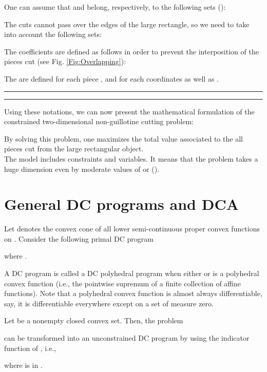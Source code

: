 \documentclass{iesmart}
\begin{document}
One can assume that  and  belong, respectively, to the
following sets (\cite{Beasley1985,Nepomuceno}):



The cuts cannot pass over the edges of the large rectangle, so we
need to take into account the following sets:




The coefficients  are defined as follows in order to
prevent the interposition of the pieces cut (see Fig.
\ref{Fig:Overlapping}):

The  are defined for each piece , and for
each coordinates  as well as .

\begin{figure*}
\hrule
{}\hrule \caption{Overlapping of the pieces  and .}
\label{Fig:Overlapping}
\end{figure*}

Using these notations, we can now present the mathematical
formulation of the constrained two-dimensional non-guillotine
cutting problem:


By solving this problem, one maximizes the total value associated
to the all pieces cut from the large rectangular object. \\
The model includes  constraints and  variables. It
means that the problem takes a huge dimension even by moderate
values of  or  ().


\section{General DC programs and DCA}\label{sec:GeneralDCetDCA}

Let  denotes the convex cone of
all lower semi-continuous proper convex functions on
. Consider the following primal DC program

where .


A DC program  is called a DC polyhedral program when
either  or  is a polyhedral convex  function (i.e., the
pointwise supremum of a finite collection of affine functions).
Note that a polyhedral convex function is almost always
differentiable, say, it is differentiable everywhere except on a
set of measure zero.

Let  be a nonempty closed convex set. Then, the problem

can be transformed into an unconstrained DC program by using the
indicator function of , i.e.,

where  is   in .
\end{document}
